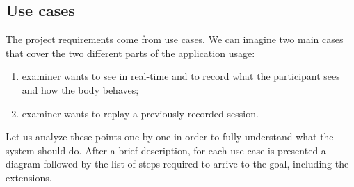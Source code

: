 \documentclass[binding=0.6cm,LaM]{sapthesis}
\begin{document}
\subsection{Use cases}
The project requirements come from use cases. We can imagine two main cases that cover the two different parts of the application usage:

\begin{enumerate}

\item examiner wants to see in real-time and to record what the participant sees and how the body behaves;

\item examiner wants to replay a previously recorded session.

\end{enumerate}

Let us analyze these points one by one in order to fully understand what the system should do. After a brief description, for each use case is presented a diagram followed by the list of steps required to arrive to the goal, including the extensions.
\end{document}
